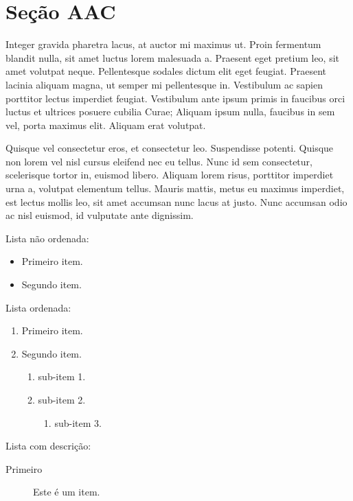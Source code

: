 \documentclass{article}
\begin{document}
	\section{Seção AAC}
	
	Integer gravida pharetra lacus, at auctor mi maximus ut. Proin fermentum blandit nulla, sit amet luctus lorem malesuada a. Praesent eget pretium leo, sit amet volutpat neque. Pellentesque sodales dictum elit eget feugiat. Praesent lacinia aliquam magna, ut semper mi pellentesque in. Vestibulum ac sapien porttitor lectus imperdiet feugiat. Vestibulum ante ipsum primis in faucibus orci luctus et ultrices posuere cubilia Curae; Aliquam ipsum nulla, faucibus in sem vel, porta maximus elit. Aliquam erat volutpat.
	
	Quisque vel consectetur eros, et consectetur leo. Suspendisse potenti. Quisque non lorem vel nisl cursus eleifend nec eu tellus. Nunc id sem consectetur, scelerisque tortor in, euismod libero. Aliquam lorem risus, porttitor imperdiet urna a, volutpat elementum tellus. Mauris mattis, metus eu maximus imperdiet, est lectus mollis leo, sit amet accumsan nunc lacus at justo. Nunc accumsan odio ac nisl euismod, id vulputate ante dignissim.
	
	Lista não ordenada:
	
	\begin{itemize}
		\item Primeiro item.
		\item Segundo item.
	\end{itemize}
	
	Lista ordenada:
	
	\begin{enumerate}
		\item Primeiro item.
		\item Segundo item.
		\begin{enumerate}
			\item sub-item 1.
			\item sub-item 2.
			\begin{enumerate}
				\item sub-item 3.
			\end{enumerate}
		\end{enumerate}
	\end{enumerate}
	
	Lista com descrição:
	
	\begin{description}
		\item[Primeiro] Este é um item.
	\end{description}
	
\end{document}
